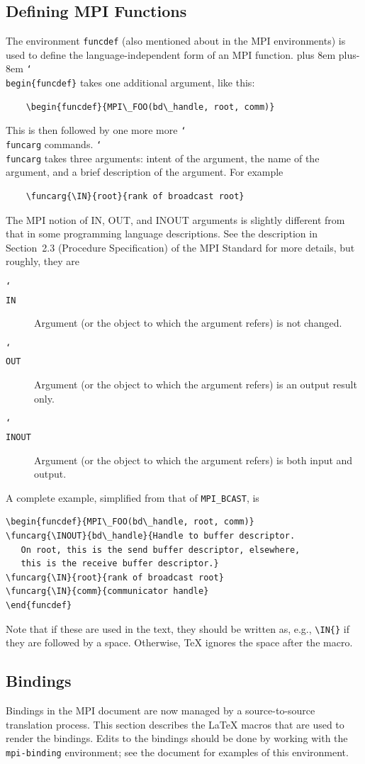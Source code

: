 \documentclass[letterpaper,twoside,11pt,fleqn]{article}
\def\cmd#1{\texttt{\char`\\#1}}
\def\MPI/{\textsf{MPI}}    %
\def\gb{\penalty10000\hskip 0pt plus 8em\penalty4800\hskip 0pt plus-8em%
\penalty10000}
\begin{document}
\subsection{Defining \texorpdfstring{\MPI/}{MPI} Functions}
\label{sec:defining-functions}
The environment \texttt{funcdef} (also mentioned about in the \MPI/
environments) is used to define the
language-independent form of an \MPI/ function.
\gb\cmd{begin\{funcdef\}} takes one additional argument, like this:
\begin{verbatim}
    \begin{funcdef}{MPI\_FOO(bd\_handle, root, comm)}
\end{verbatim}
This is then followed by one more more \cmd{funcarg} commands.
\cmd{funcarg} takes three arguments: intent of the argument, the name
of the argument, and a brief description of the argument.  For example
\begin{verbatim}
    \funcarg{\IN}{root}{rank of broadcast root}
\end{verbatim}
The \MPI/ notion of IN, OUT, and INOUT arguments is slightly different
from that in some programming language descriptions.  See the
description in Section~2.3 (Procedure Specification) of the \MPI/
Standard for more details, but roughly, they are
\begin{description}
\item[\cmd{IN}]Argument (or the object to which the argument refers)
  is not changed.
\item[\cmd{OUT}]Argument (or the object to which the argument refers)
  is an output result only.
\item[\cmd{INOUT}]Argument (or the object to which the argument
  refers) is both input and output.
\end{description}
A complete example, simplified from that of \texttt{MPI\_BCAST}, is
\begin{verbatim}
\begin{funcdef}{MPI\_FOO(bd\_handle, root, comm)}
\funcarg{\INOUT}{bd\_handle}{Handle to buffer descriptor.
   On root, this is the send buffer descriptor, elsewhere,
   this is the receive buffer descriptor.}
\funcarg{\IN}{root}{rank of broadcast root}
\funcarg{\IN}{comm}{communicator handle}
\end{funcdef}
\end{verbatim}
Note that if these are used in the text, they should be written as,
e.g., \verb+\IN{}+ if they are followed by a space.
Otherwise, TeX ignores the space after the macro.

\subsection{Bindings}
Bindings in the \MPI/ document are now managed by a source-to-source
translation process.
This section describes the LaTeX macros that are used to render the
bindings.
Edits to the bindings should be done by working with the
\verb+mpi-binding+ environment; see the document for examples of this
environment.
\end{document}
